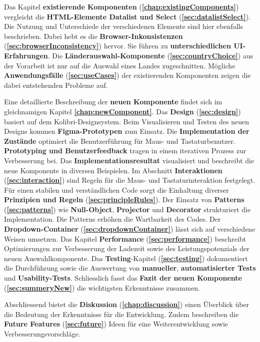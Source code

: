 Das Kapitel \textbf{existierende Komponenten} (\textbf{\ref{chap:existingComponents}}) vergleicht die \textbf{HTML-Elemente Datalist und Select} (\textbf{\ref{sec:datalistSelect}}). 
Die Nutzung und Unterschiede der verschiedenen Elemente sind hier ebenfalls beschrieben. 
Dabei hebt es die \textbf{Browser-Inkonsistenzen} (\textbf{\ref{sec:browserInconsistency}}) hervor. 
Sie führen zu \textbf{unterschiedlichen UI-Erfahrungen}. 
Die \textbf{Länderauswahl-Kom\-po\-nente} (\textbf{\ref{sec:countryChoice}}) aus der Vorarbeit ist nur auf die Auswahl eines Landes zugeschnitten. 
Mögliche \textbf{Anwendungsfälle} (\textbf{\ref{sec:useCases}}) der existierenden Komponenten zeigen die dabei entstehenden Probleme auf. 

Eine detaillierte Beschreibung der \textbf{neuen Komponente} findet sich im gleichnamigen Kapitel \textbf{\ref{chap:newComponent}}. 
Das \textbf{Design} (\textbf{\ref{sec:design}}) basiert auf dem Kolibri-Designsystem. 
Beim Visualisieren und Testen des neuen Designs kommen \textbf{Figma-Prototypen} zum Einsatz. 
Die \textbf{Implementation der Zustände} optimiert die Benutzerführung für Maus- und Tastaturbenutzer. 
\textbf{Prototyping und Benutzerfeedback} tragen in einem iterativen Prozess zur Verbesserung bei.
Das \textbf{Implementationsresultat} visualisiert und beschreibt die neue Komponente in diversen Beispielen.
Im Abschnitt \textbf{Interaktionen} (\textbf{\ref{sec:interaction}}) sind Regeln für die Maus- und Tastaturinteraktion festgelegt. 
Für einen stabilen und verständlichen Code sorgt die Einhaltung diverser \textbf{Prinzipien und Regeln} (\textbf{\ref{sec:principleRules}}). 
Der Einsatz von \textbf{Patterns} (\textbf{\ref{sec:patterns}}) wie \textbf{Null-Object}, \textbf{Projector} und \textbf{Decorator} strukturiert die Implementation. 
Die Patterns erhöhen die Wartbarkeit des Codes. 
Der \textbf{Dropdown-Container} (\textbf{\ref{sec:dropdownContainer}}) lässt sich auf verschiedene Weisen umsetzen. 
Das Kapitel \textbf{Performance} (\textbf{\ref{sec:performance}}) beschreibt Optimierungen zur Verbesserung der Ladezeit sowie des Leistungspotenzials der neuen Auswahlkomponente. 
Das \textbf{Testing}-Kapitel (\textbf{\ref{sec:testing}}) dokumentiert die Durchführung sowie die Auswertung von \textbf{manueller}, \textbf{automatisierter Tests} und \textbf{Usability-Tests}. 
Schliesslich fasst das \textbf{Fazit der neuen Komponente} (\textbf{\ref{sec:summeryNew}}) die wichtigsten Erkenntnisse zusammen. 

Abschliessend bietet die \textbf{Diskussion} (\textbf{\ref{chap:discussion}}) einen Überblick über die Bedeutung der Erkenntnisse für die Entwicklung. 
Zudem beschreiben die \textbf{Future Features} (\textbf{\ref{sec:future}}) Ideen für eine Weiterentwicklung sowie Verbesserungsvorschläge. 
